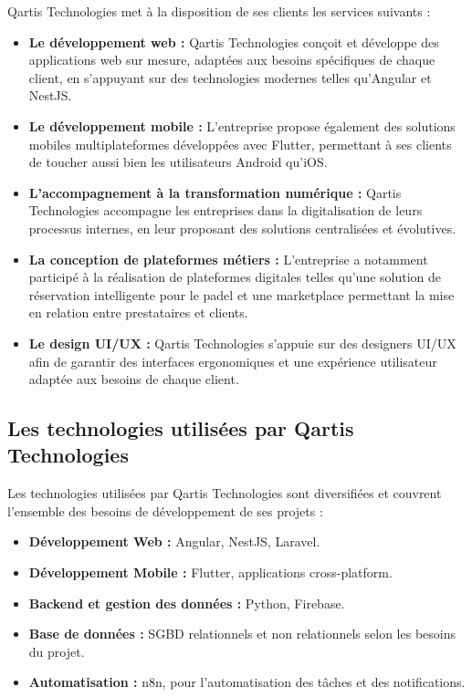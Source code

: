 Qartis Technologies met à la disposition de ses clients les services suivants :

\begin{itemize}
    \item \textbf{Le développement web :}
    Qartis Technologies conçoit et développe des applications web sur mesure, adaptées aux besoins spécifiques de chaque client, en s'appuyant sur des technologies modernes telles qu'Angular et NestJS.

    \item \textbf{Le développement mobile :}
    L'entreprise propose également des solutions mobiles multiplateformes développées avec Flutter, permettant à ses clients de toucher aussi bien les utilisateurs Android qu'iOS.

    \item \textbf{L'accompagnement à la transformation numérique :}
    Qartis Technologies accompagne les entreprises dans la digitalisation de leurs processus internes, en leur proposant des solutions centralisées et évolutives.

    \item \textbf{La conception de plateformes métiers :}
    L'entreprise a notamment participé à la réalisation de plateformes digitales telles qu'une solution de réservation intelligente pour le padel et une marketplace permettant la mise en relation entre prestataires et clients.

    \item \textbf{Le design UI/UX :}
    Qartis Technologies s'appuie sur des designers \ac{UI}/\ac{UX} afin de garantir des interfaces ergonomiques et une expérience utilisateur adaptée aux besoins de chaque client.
\end{itemize}

\subsection{Les technologies utilisées par Qartis Technologies}

Les technologies utilisées par Qartis Technologies sont diversifiées et couvrent l'ensemble des besoins de développement de ses projets :

\begin{itemize}
    \item \textbf{Développement Web :} Angular, NestJS, Laravel.
    \item \textbf{Développement Mobile :} Flutter, applications cross-platform.
    \item \textbf{Backend et gestion des données :} Python, Firebase.
    \item \textbf{Base de données :} \ac{SGBD} relationnels et non relationnels selon les besoins du projet.
    \item \textbf{Automatisation :} n8n, pour l'automatisation des tâches et des notifications.
\end{itemize}

